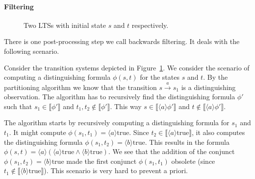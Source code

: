 \documentclass{article}
\newcommand{\pijl}[1]{\stackrel{#1}{\longrightarrow}}
\newcommand{\sem}[1]{\llbracket #1 \rrbracket}
\begin{document}
\paragraph*{Filtering}
\begin{figure}[b]
  \begin{center}
  \end{center}
  \caption{Two LTSs with initial state $s$ and $t$ respectively.\label{fig:filtering}}
  \end{figure}

There is one post-processing step we call backwards filtering. It deals with the
following scenario. 

Consider the transition systems depicted in Figure~\ref{fig:filtering}. We
consider the scenario of computing a distinguishing formula $\phi(s,t)$ for the
states $s$ and $t$. By the partitioning algorithm we know that the transition
$s\pijl{a}s_1$ is a distinguishing observation. The algorithm has to recursively
find the distinguishing formula $\phi'$ such that $s_1 \in \sem{\phi'}$ and
$t_1,t_2 \not\in \sem{\phi'}$. This way $s\in\sem{\langle a\rangle \phi'}$ and
$t\not\in\sem{\langle a \rangle \phi'}$.

The algorithm starts by recursively computing a distinguishing formula for $s_1$
and $t_1$. It might compute $\phi(s_1, t_1) = \langle a \rangle \mathrm{true}$.
Since $t_2 \in \sem{ \langle a \rangle \mathrm{true}}$, it also computes the
distinguishing formula $\phi(s_1,t_2) = \langle b\rangle \mathrm{true}$. This
results in the formula $\phi(s,t) = \langle a \rangle (\langle a \rangle
\mathrm{true} \wedge \langle b \rangle \mathrm{true})$. We see that the addition
of the conjunct $\phi(s_1, t_2) = \langle b \rangle \mathrm{true}$ made the
first conjunct $\phi(s_1, t_1)$ obsolete (since $t_1\not\in\sem{\langle b\rangle
\mathrm{true}}$). This scenario is very hard to prevent a priori.  
\end{document}
